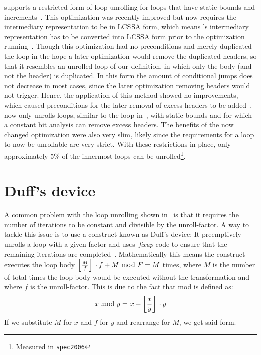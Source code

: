\libFIRM{} supports a restricted form of loop unrolling for loops that have static bounds and increments~\cite{helmer10studienarbeit}.
This optimization was recently improved but now requires the intermediary representation to be in LCSSA form, which means \libFIRM{}'s intermediary representation has to be converted into LCSSA form prior to the optimization running~\cite{aebi18bachelorarbeit}.
Though this optimization had no preconditions and merely duplicated the loop in the hope a later optimization would remove the duplicated headers, so that it resembles an unrolled loop of our definition, in which only the body (and not the header) is duplicated.
In this form the amount of conditional jumps does not decrease in most cases, since the later optimization removing headers would not trigger.
Hence, the application of this method showed no improvements, which caused preconditions for the later removal of excess headers to be added~\cite{libfirm-unroll-static}.
\libFIRM{} now only unrolls loops, similar to the loop in~, with static bounds and for which a constant bit analysis can remove excess headers.
The benefits of the now changed optimization were also very slim, likely since the requirements for a loop to now be unrollable are very strict.
With these restrictions in place, only approximately 5\% of the innermost loops can be unrolled\footnote{Measured in \texttt{spec2006}}.




\section{Duff's device}\label{sec:basics:duffs}

A common problem with the loop unrolling shown in~ is that it requires the number of iterations to be constant and divisible by the unroll-factor.
A way to tackle this issue is to use a construct known as Duff's device: It preemptively unrolls a loop with a given factor and uses~\textit{fixup} code to ensure that the remaining iterations are completed~\cite{duff_1983}.
Mathematically this means the construct executes the loop body $\left\lfloor{}\frac{M}{f}\right\rfloor{} \cdot f + M \text{ mod } F = M$ times, where $M$ is the number of total times the loop body would be executed without the transformation and where $f$ is the unroll-factor.
This is due to the fact that mod is defined as:
$$x \text{ mod }{} y = x - \left\lfloor{}\frac{x}{y}\right\rfloor{} \cdot y$$
If we substitute $M$ for $x$ and $f$ for $y$ and rearrange for $M$, we get said form.

